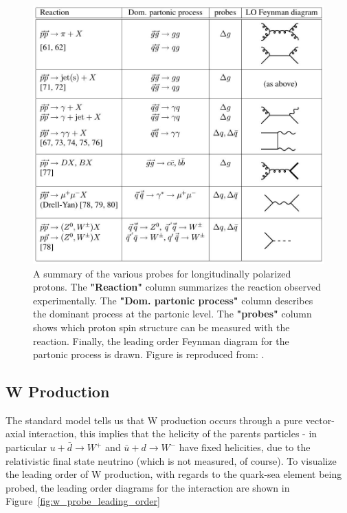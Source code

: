 \begin{figure}[ht]
  \centering
  \includegraphics[width=\linewidth]{./figures/spin_probes.jpg}
  \caption{
    A summary of the various probes for longitudinally polarized protons. The
    \textbf{"Reaction"} column summarizes the reaction observed experimentally.
    The \textbf{"Dom. partonic process"} column describes the dominant process
    at the partonic level. The \textbf{"probes"} column shows which proton spin
    structure can be measured with the reaction. Finally, the leading order
    Feynman diagram for the partonic process is drawn. Figure is reproduced
    from: \cite{Aidala2005}.
  }
  \label{fig:spin_probes_masterspin}

\end{figure}

\subsection{W Production}

The standard model tells us that W production occurs through a pure vector-axial
interaction, this implies that the helicity of the parents particles - in
particular $u+\bar{d}\rightarrow W^+$ and $\bar{u}+d\rightarrow W^-$ have fixed
helicities, due to the relativistic final state neutrino (which is not measured,
of course). To visualize the leading order of W production, with regards to the
quark-sea element being probed, the leading order diagrams for the interaction
are shown in Figure~\ref{fig:w_probe_leading_order}~\cite{Aidala2005}

